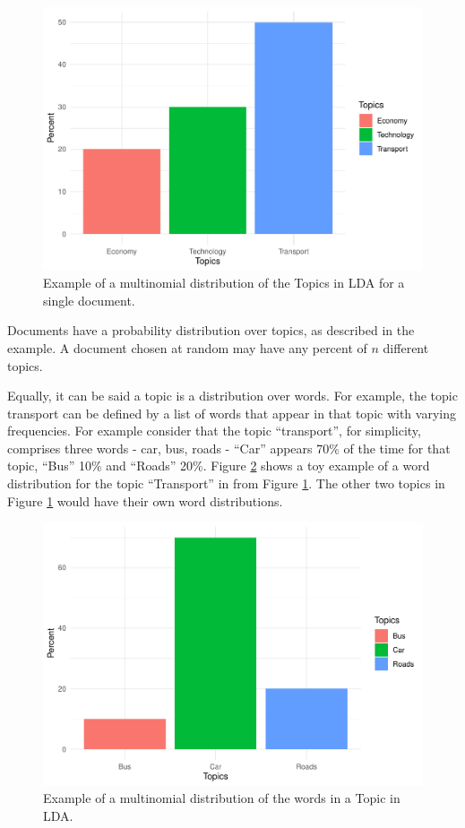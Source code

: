 \documentclass[
]{article}
\begin{document}
\begin{figure}

{\centering \includegraphics[width=0.5\linewidth]{00---Actual-Dissertation_files/figure-latex/plot1-1} 

}

\caption{Example of a multinomial distribution of the Topics in LDA for a single document.}\label{fig:plot1}
\end{figure}

Documents have a probability distribution over topics, as described in
the example. A document chosen at random may have any percent of \(n\)
different topics.

Equally, it can be said a topic is a distribution over words. For
example, the topic transport can be defined by a list of words that
appear in that topic with varying frequencies. For example consider that
the topic ``transport'', for simplicity, comprises three words - car,
bus, roads - ``Car'' appears 70\% of the time for that topic, ``Bus''
10\% and ``Roads'' 20\%. Figure \ref{fig:plot2} shows a toy example of a
word distribution for the topic ``Transport'' in from Figure
\ref{fig:plot1}. The other two topics in Figure \ref{fig:plot1} would
have their own word distributions.

\begin{figure}

{\centering \includegraphics[width=0.5\linewidth]{00---Actual-Dissertation_files/figure-latex/plot2-1} 

}

\caption{Example of a multinomial distribution of the words in a Topic in LDA.}\label{fig:plot2}
\end{figure}
\end{document}

